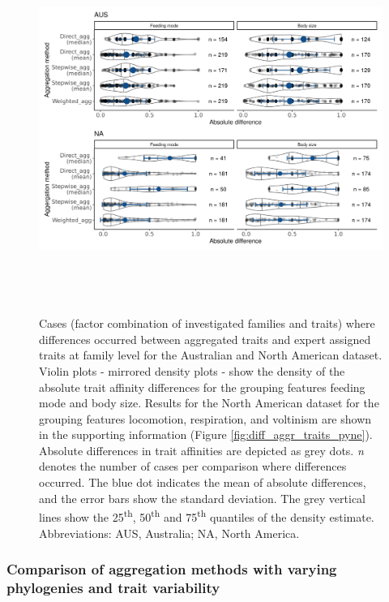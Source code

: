 \documentclass[12pt]{article}
\begin{document}
\newpage

\begin{figure}[H]
  \centering
  \includegraphics[width=16.5cm, height=12cm]{Deviances_trait_agg_combined.png}
  \caption{Cases (factor combination of investigated families and traits) where differences occurred between aggregated traits and expert assigned traits at family level for the Australian and North American dataset. Violin plots - mirrored density plots - show the density of the absolute trait affinity differences for the grouping features feeding mode and body size. Results for the North American dataset for the grouping features locomotion, respiration, and voltinism are shown in the supporting information (Figure \ref{fig:diff_aggr_traits_pyne}). Absolute differences in trait affinities are depicted as grey dots. \textit{n} denotes the number of cases per comparison where differences occurred. The blue dot indicates the mean of absolute differences, and the error bars show the standard deviation. The grey vertical lines show the 25\textsuperscript{th}, 50\textsuperscript{th} and 75\textsuperscript{th} quantiles of the density estimate. Abbreviations: AUS, Australia; NA, North America.}
  \label{fig:diff_aggr_traits_combined}
\end{figure}

\newpage 


\subsubsection*{Comparison of aggregation methods with varying phylogenies and trait variability}
\end{document}
